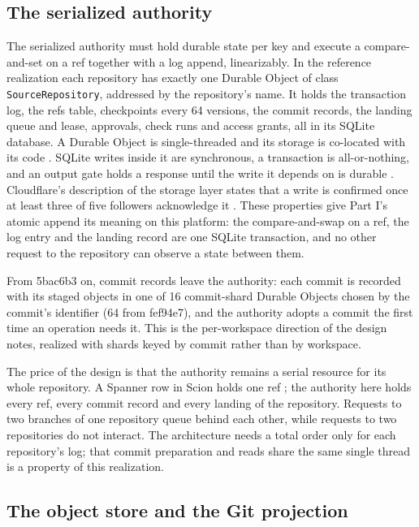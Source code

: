\documentclass[11pt,letterpaper]{article}
\theoremstyle{definition}
\theoremstyle{remark}
\begin{document}
\subsection{The serialized authority}

The serialized authority must hold durable state per key and execute a compare-and-set on a ref together with a log append, linearizably. In the reference realization each repository has exactly one Durable Object of class \texttt{SourceRepository}, addressed by the repository's name. It holds the transaction log, the refs table, checkpoints every 64 versions, the commit records, the landing queue and lease, approvals, check runs and access grants, all in its SQLite database. A Durable Object is single-threaded and its storage is co-located with its code \cite{cfdoconcepts}. SQLite writes inside it are synchronous, a transaction is all-or-nothing, and an output gate holds a response until the write it depends on is durable \cite{cfdosqlite}. Cloudflare's description of the storage layer states that a write is confirmed once at least three of five followers acknowledge it \cite{varda2024sqlite}. These properties give Part I's atomic append its meaning on this platform: the compare-and-swap on a ref, the log entry and the landing record are one SQLite transaction, and no other request to the repository can observe a state between them.

From 5bac6b3 on, commit records leave the authority: each commit is recorded with its staged objects in one of 16 commit-shard Durable Objects chosen by the commit's identifier (64 from fef94e7), and the authority adopts a commit the first time an operation needs it. This is the per-workspace direction of the design notes, realized with shards keyed by commit rather than by workspace.

The price of the design is that the authority remains a serial resource for its whole repository. A Spanner row in Scion holds one ref \cite{anthropic2026scion,corbett2012spanner}; the authority here holds every ref, every commit record and every landing of the repository. Requests to two branches of one repository queue behind each other, while requests to two repositories do not interact. The architecture needs a total order only for each repository's log; that commit preparation and reads share the same single thread is a property of this realization.

\subsection{The object store and the Git projection}
\end{document}
